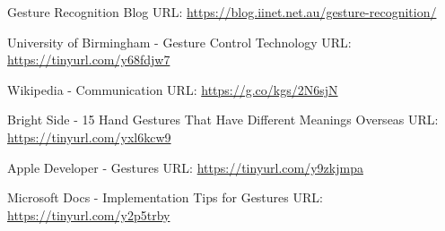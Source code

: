\documentclass{article}
\begin{document}
\begin{thebibliography}{00}
 Gesture Recognition Blog
\newline
URL: \url{https://blog.iinet.net.au/gesture-recognition/}

 University of Birmingham - Gesture Control Technology
\newline
URL: \url{https://tinyurl.com/y68fdjw7}

 Wikipedia - Communication
\newline
URL: \url{https://g.co/kgs/2N6sjN}

 Bright Side - 15 Hand Gestures That Have Different Meanings Overseas
\newline
URL: \url{https://tinyurl.com/yxl6kcw9}

 Apple Developer - Gestures
\newline
URL: \url{https://tinyurl.com/y9zkjmpa}

 Microsoft Docs - Implementation Tips for Gestures
\newline
URL: \url{https://tinyurl.com/y2p5trby}

\end{thebibliography}

\end{document}
